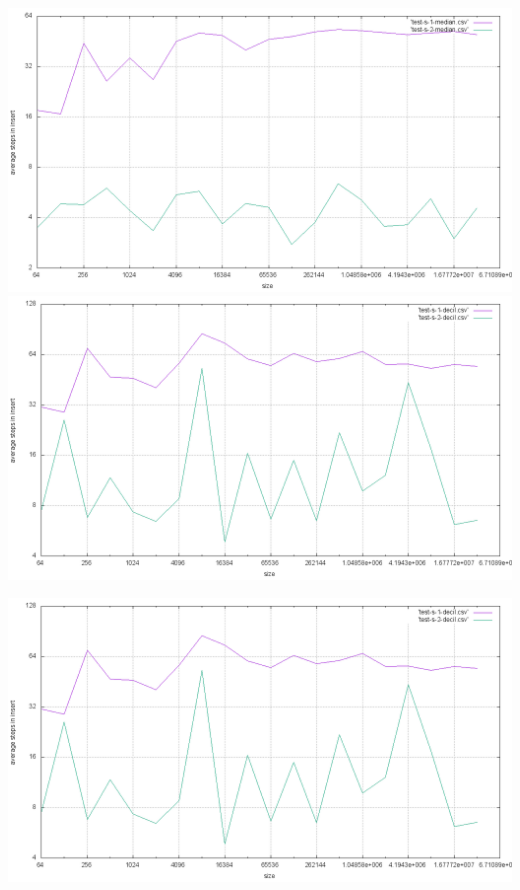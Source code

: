 \documentclass[12pt,a4paper]{report}
\begin{document}
\includegraphics[width=\textwidth]{./tests/sequence_test/uniform-test4.png}
\includegraphics[width=\textwidth]{./tests/sequence_test/uniform-test5.png}





\includegraphics[width=\textwidth]{./tests/sequence_test/uniform-test.png}
  
\end{document}
